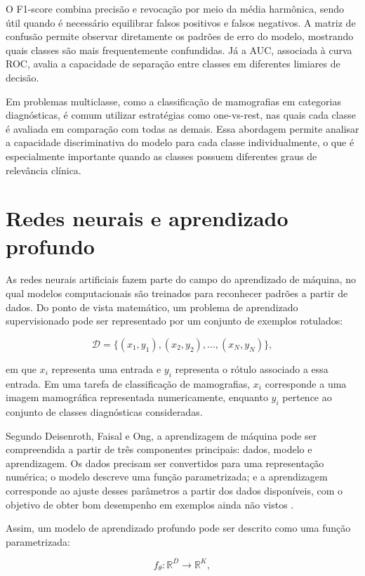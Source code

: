 \documentclass[
    12pt,
    openright,
    oneside,
    a4paper,
    english,
    brazil
]{abntex2}
\begin{document}
O F1-score combina precisão e revocação por meio da média harmônica, sendo útil quando é necessário equilibrar falsos positivos e falsos negativos. A matriz de confusão permite observar diretamente os padrões de erro do modelo, mostrando quais classes são mais frequentemente confundidas. Já a AUC, associada à curva ROC, avalia a capacidade de separação entre classes em diferentes limiares de decisão.

Em problemas multiclasse, como a classificação de mamografias em categorias diagnósticas, é comum utilizar estratégias como one-vs-rest, nas quais cada classe é avaliada em comparação com todas as demais. Essa abordagem permite analisar a capacidade discriminativa do modelo para cada classe individualmente, o que é especialmente importante quando as classes possuem diferentes graus de relevância clínica.

\section{Redes neurais e aprendizado profundo}

As redes neurais artificiais fazem parte do campo do aprendizado de máquina, no qual modelos computacionais são treinados para reconhecer padrões a partir de dados. Do ponto de vista matemático, um problema de aprendizado supervisionado pode ser representado por um conjunto de exemplos rotulados:

\[
\mathcal{D} = \{(x_1,y_1),(x_2,y_2),\ldots,(x_N,y_N)\},
\]

em que \(x_i\) representa uma entrada e \(y_i\) representa o rótulo associado a essa entrada. Em uma tarefa de classificação de mamografias, \(x_i\) corresponde a uma imagem mamográfica representada numericamente, enquanto \(y_i\) pertence ao conjunto de classes diagnósticas consideradas.

Segundo Deisenroth, Faisal e Ong, a aprendizagem de máquina pode ser compreendida a partir de três componentes principais: dados, modelo e aprendizagem. Os dados precisam ser convertidos para uma representação numérica; o modelo descreve uma função parametrizada; e a aprendizagem corresponde ao ajuste desses parâmetros a partir dos dados disponíveis, com o objetivo de obter bom desempenho em exemplos ainda não vistos \cite{deisenroth2020mathematics}.

Assim, um modelo de aprendizado profundo pode ser descrito como uma função parametrizada:

\[
f_{\theta}: \mathbb{R}^{D} \rightarrow \mathbb{R}^{K},
\]
\end{document}
